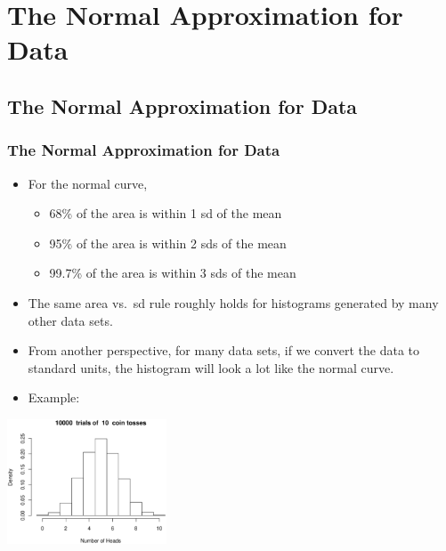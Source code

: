 \documentclass[t]{beamer}
\begin{document}
\section[Normal Approximation]{The Normal Approximation for Data}
\subsection[Normal Approximation]{The Normal Approximation for Data}
\begin{frame}[t]\frametitle{The Normal Approximation for Data}
{\small
\begin{itemize}
\item For the normal curve, 
   \begin{itemize} 
   \item 68\% of the area is within 1 sd of the mean
   \item 95\% of the area is within 2 sds of the mean
   \item 99.7\% of the area is within 3 sds of the mean
   \end{itemize}
\item The same area vs.~sd rule roughly holds for histograms generated by 
  many other data sets.
\item From another perspective, for many data sets, if we convert the data
  to standard units, the histogram will look a lot like the normal curve.
\item Example:  \vspace{-.3in}
\end{itemize}
\begin{center}
\includegraphics[height=3.7cm]{CoinHistogram.eps}
\end{center}
}
\end{frame}
\end{document}
